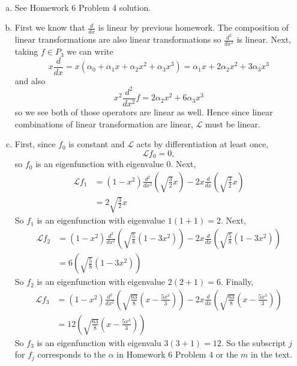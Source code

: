 \documentclass[12pt]{article} %
\begin{document}
\begin{solution}~
\begin{enumerate}[(a)]
    \item See Homework 6 Problem 4 solution.
    \item First we know that $\frac{d}{dx}$ is linear by previous homework. The composition of linear transformations are also linear transformations so $\frac{d^2}{dx^2}$ is linear. Next, taking $f \in P_3$ we can write
    \[
        x \frac{d}{dx} = x (\alpha_0  + \alpha_1 x + \alpha_2 x^2 + \alpha_3 x^3) = \alpha_1 x + 2 \alpha_2 x^2 + 3 \alpha_3 x^3
    \]
    and also
    \[
    x^2 \frac{d^2}{dx^2} f =   2 \alpha_2 x^2 + 6\alpha_3 x^3
    \]
    so we see both of those operators are linear as well. Hence since linear combinations of linear transformation are linear, $\mathcal{L}$ must be linear.
    \item First, since $f_0$ is constant and $\mathcal{L}$ acts by differentiation at least once,
    \[
    \mathcal{L} f_0 = 0,
    \]
    so $f_0$ is an eigenfunction with eigenvalue 0. Next,
    \begin{align*}
        \mathcal{L} f_1 &= (1-x^2) \frac{d^2}{dx^2}\left(\sqrt{\frac{3}{2}}x\right) - 2x \frac{d}{dx} \left( \sqrt{\frac{3}{2}}x \right) \\
    &= 2 \sqrt{\frac{3}{2}} x
    \end{align*}
    So $f_1$ is an eigenfunction with eigenvalue $1(1+1)=2$. Next,
    \begin{align*}
        \mathcal{L} f_2 &= (1-x^2) \frac{d^2}{dx^2}\left(\sqrt{\frac{5}{8}} (1-3x^2)\right) - 2x \frac{d}{dx} \left( \sqrt{\frac{5}{8}} (1-3x^2) \right) \\
    &= 6 \left( \sqrt{\frac{5}{8}} (1-3x^2) \right)
    \end{align*}
   So $f_2$ is an eigenfunction with eigenvalue $2(2+1)=6$. Finally,
    \begin{align*}
        \mathcal{L} f_3 &= (1-x^2) \frac{d^2}{dx^2}\left(\sqrt{\frac{63}{8}}\left(x-\frac{5x^3}{3}\right)\right) - 2x \frac{d}{dx} \left( \sqrt{\frac{63}{8}}\left(x-\frac{5x^3}{3}\right)\right) \\
    &= 12 \left( \sqrt{\frac{63}{8}}\left(x-\frac{5x^3}{3}\right) \right)
    \end{align*}
    So $f_3$ is an eigenfunction with eigenvalu $3(3+1)=12$. So the subscript $j$ for $f_j$ corresponds to the $\alpha$ in Homework 6 Problem 4 or the $m$ in the text.
\end{enumerate}
\end{solution}
\end{document}
